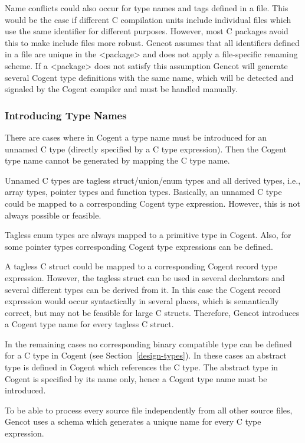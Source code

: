 Name conflicts could also occur for type names and tags defined in a  file. This would be the case if different
C compilation units include individual  files which use the same identifier for different purposes. However, most
C packages avoid this to make include files more robust. Gencot assumes that all identifiers defined in a  file
are unique in the <package> and does not apply a file-specific renaming scheme. If a <package> does not satisfy this assumption
Gencot will generate several Cogent type definitions with the same name, which will be detected and signaled by the Cogent 
compiler and must be handled manually.

\subsubsection{Introducing Type Names}

There are cases where in Cogent a type name must be introduced for an unnamed C type (directly specified by a C type 
expression). Then the Cogent type name cannot be generated by mapping the C type name.

Unnamed C types are tagless struct/union/enum types and all derived types, i.e., array types, pointer types and 
function types. Basically, an unnamed C type could be mapped to a corresponding Cogent type expression. However,
this is not always possible or feasible.

Tagless enum types
are always mapped to a primitive type in Cogent. Also, for some pointer types corresponding Cogent type expressions can
be defined. 

A tagless C struct could be mapped to a corresponding Cogent record type expression. However, the tagless struct
can be used in several declarators and several different types can be derived from it. In this case the Cogent record
expression would occur syntactically in several places, which is semantically correct, but may not be feasible for
large C structs. Therefore, Gencot introduces a Cogent type name for every tagless C struct.

In the remaining cases no corresponding binary compatible type can be defined for a C type in Cogent (see Section~\ref{design-types}). In these cases 
an abstract type is defined in Cogent which references the C type. The abstract type in Cogent is specified by its 
name only, hence a Cogent type name must be introduced.

To be able to process every source file independently from all other source files, Gencot uses a schema which generates
a unique name for every C type expression. 

